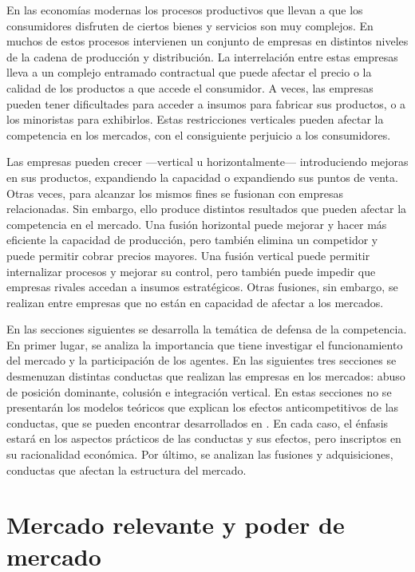 \documentclass[
  12pt,
  spanish,
]{book}
\begin{document}
En las economías modernas los procesos productivos que llevan a que los consumidores disfruten de ciertos bienes y servicios son muy complejos. En muchos de estos procesos intervienen un conjunto de empresas en distintos niveles de la cadena de producción y distribución. La interrelación entre estas empresas lleva a un complejo entramado contractual que puede afectar el precio o la calidad de los productos a que accede el consumidor. A veces, las empresas pueden tener dificultades para acceder a insumos para fabricar sus productos, o a los minoristas para exhibirlos. Estas restricciones verticales pueden afectar la competencia en los mercados, con el consiguiente perjuicio a los consumidores.

Las empresas pueden crecer ---vertical u horizontalmente--- introduciendo mejoras en sus productos, expandiendo la capacidad o expandiendo sus puntos de venta. Otras veces, para alcanzar los mismos fines se fusionan con empresas relacionadas. Sin embargo, ello produce distintos resultados que pueden afectar la competencia en el mercado. Una fusión horizontal puede mejorar y hacer más eficiente la capacidad de producción, pero también elimina un competidor y puede permitir cobrar precios mayores. Una fusión vertical puede permitir internalizar procesos y mejorar su control, pero también puede impedir que empresas rivales accedan a insumos estratégicos. Otras fusiones, sin embargo, se realizan entre empresas que no están en capacidad de afectar a los mercados.

En las secciones siguientes se desarrolla la temática de defensa de la competencia. En primer lugar, se analiza la importancia que tiene investigar el funcionamiento del mercado y la participación de los agentes. En las siguientes tres secciones se desmenuzan distintas conductas que realizan las empresas en los mercados: abuso de posición dominante, colusión e integración vertical. En estas secciones no se presentarán los modelos teóricos que explican los efectos anticompetitivos de las conductas, que se pueden encontrar desarrollados en \citet{Motta2004}. En cada caso, el énfasis estará en los aspectos prácticos de las conductas y sus efectos, pero inscriptos en su racionalidad económica. Por último, se analizan las fusiones y adquisiciones, conductas que afectan la estructura del mercado.

\hypertarget{mercado-relevante-y-poder-de-mercado}{%
\section{Mercado relevante y poder de mercado}\label{mercado-relevante-y-poder-de-mercado}}
\end{document}

